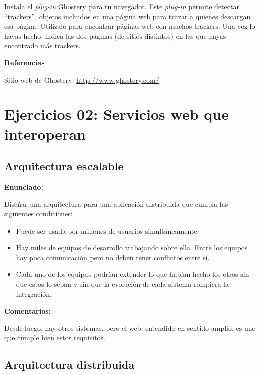Instala el \emph{plug-in} Ghostery para tu navegador. Este \emph{plug-in} permite detectar ``trackers'', objetos incluidos en una página web para trazar a quienes descargan esa página. Utilízalo para encontrar páginas web con muchos trackers. Una vez lo hayas hecho, indica las dos páginas (de sitios distintos) en las que hayas encontrado más trackers.

\textbf{Referencias}

Sitio web de Ghostery: \url{http://www.ghostery.com/}


\section{Ejercicios 02: Servicios web que interoperan}



\subsection{Arquitectura escalable}
\label{subsec:arq-escalable}

\textbf{Enunciado:}

Diseñar una arquitectura para una aplicación distribuida que cumpla las siguientes condiciones:

\begin{itemize}
\item Puede ser usada por millones de usuarios simultáneamente.
\item Hay miles de equipos de desarrollo trabajando sobre ella. Entre los equipos hay poca comunicación pero no deben tener conflictos entre sí.
\item Cada uno de los equipos podrían extender lo que habían hecho los otros sin que estos lo sepan y sin que la evolución de cada sistema rompiera la integración.
\end{itemize}

\textbf{Comentarios:}

Desde luego, hay otros sistemas, pero el web, entendido en sentido amplio, es uno que cumple bien estos requisitos.


\subsection{Arquitectura distribuida}
\label{subsec:arq-distribuida}

